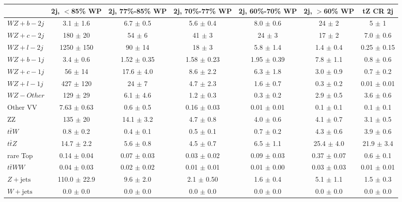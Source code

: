 \begin{tabular}{|l|c|c|c|c|c|c|}
\hline 
 & {2j, $<$85\% WP} & {2j, 77\%-85\% WP} & {2j, 70\%-77\% WP} & {2j, 60\%-70\% WP} & {2j, $>$60\% WP} & {tZ CR 2j}\\
\hline 
  $WZ + b - 2j$   & 3.1 $\pm$ 1.6 & 6.7 $\pm$ 0.5 & 5.6 $\pm$ 0.4 & 8.0 $\pm$ 0.6 & 24 $\pm$ 2 & 5 $\pm$ 1 \\ 
  $WZ + c - 2j$   & 180 $\pm$ 20 & 54 $\pm$ 6 & 41 $\pm$ 3 & 24 $\pm$ 3 & 17 $\pm$ 2 & 7.0 $\pm$ 0.6 \\ 
  $WZ + l - 2j$   & 1250 $\pm$ 150 & 90 $\pm$ 14 & 18 $\pm$ 3 & 5.8 $\pm$ 1.4 & 1.4 $\pm$ 0.4 & 0.25 $\pm$ 0.15 \\ 
  $WZ + b - 1j$   & 3.4 $\pm$ 0.6 & 1.52 $\pm$ 0.35 & 1.58 $\pm$ 0.23 & 1.95 $\pm$ 0.39 & 7.8 $\pm$ 1.1 & 0.8 $\pm$ 0.6 \\ 
  $WZ + c - 1j$   & 56 $\pm$ 14 & 17.6 $\pm$ 4.0 & 8.6 $\pm$ 2.2 & 6.3 $\pm$ 1.8 & 3.0 $\pm$ 0.9 & 0.7 $\pm$ 0.2 \\
  $WZ + l - 1j$   & 427 $\pm$ 120 & 24 $\pm$ 7 & 4.7 $\pm$ 2.3 & 1.6 $\pm$ 0.7 & 0.3 $\pm$ 0.2 & 0.01 $\pm$ 0.01 \\
  $WZ - Other$   & 129 $\pm$ 29 & 6.1 $\pm$ 4.6 & 1.2 $\pm$ 0.3 & 0.3 $\pm$ 0.2 & 2.9 $\pm$ 0.5 & 3.6 $\pm$ 0.6 \\
  Other VV   & 7.63 $\pm$ 0.63 & 0.6 $\pm$ 0.5 & 0.16 $\pm$ 0.03 & 0.01 $\pm$ 0.01 & 0.1 $\pm$ 0.1 & 0.1 $\pm$ 0.1 \\ 
  ZZ   & 135 $\pm$ 20 & 14.1 $\pm$ 3.2 & 4.7 $\pm$ 0.8 & 4.0 $\pm$ 0.6 & 4.1 $\pm$ 0.7 & 3.1 $\pm$ 0.5 \\ 
  $t\bar{t}W$   & 0.8 $\pm$ 0.2 & 0.4 $\pm$ 0.1 & 0.5 $\pm$ 0.1 & 0.7 $\pm$ 0.2 & 4.3 $\pm$ 0.6 & 3.9 $\pm$ 0.6 \\ 
  $t\bar{t}Z$   & 14.7 $\pm$ 2.2 & 5.6 $\pm$ 0.8 & 4.5 $\pm$ 0.7 & 6.5 $\pm$ 1.1 & 25.4 $\pm$ 4.0 & 21.9 $\pm$ 3.4 \\ 
  rare Top   & 0.14 $\pm$ 0.04 & 0.07 $\pm$ 0.03 & 0.03 $\pm$ 0.02 & 0.09 $\pm$ 0.03 & 0.37 $\pm$ 0.07 & 0.6 $\pm$ 0.1 \\ 
  $t\bar{t}WW$   & 0.04 $\pm$ 0.03 & 0.02 $\pm$ 0.02 & 0.01 $\pm$ 0.01 & 0.01 $\pm$ 0.00 & 0.03 $\pm$ 0.03 & 0.01 $\pm$ 0.01 \\ 
  $Z+\text{jets}$   & 110.0 $\pm$ 22.9 & 9.6 $\pm$ 2.0 & 2.1 $\pm$ 0.50 & 1.6 $\pm$ 0.4 & 5.1 $\pm$ 1.1 & 1.5 $\pm$ 0.3 \\ 
  $W+\text{jets}$   & 0.0 $\pm$ 0.0 & 0.0 $\pm$ 0.0 & 0.0 $\pm$ 0.0 & 0.0 $\pm$ 0.0 & 0.0 $\pm$ 0.0 & 0.0 $\pm$ 0.0 \\ 

\end{tabular}
